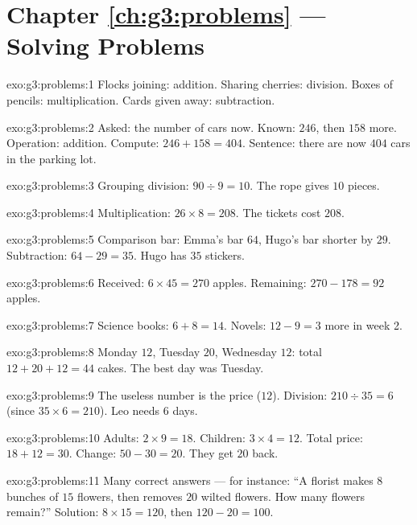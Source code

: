 \section*{Chapter \ref{ch:g3:problems} --- Solving Problems}

\begin{solution}{exo:g3:problems:1}
Flocks joining: addition. Sharing cherries: division. Boxes of
pencils: multiplication. Cards given away: subtraction.
\end{solution}

\begin{solution}{exo:g3:problems:2}
Asked: the number of cars now. Known: $246$, then $158$ more.
Operation: addition. Compute: $246 + 158 = 404$. Sentence: there are
now $404$ cars in the parking lot.
\end{solution}

\begin{solution}{exo:g3:problems:3}
Grouping division: $90 \div 9 = 10$. The rope gives $10$ pieces.
\end{solution}

\begin{solution}{exo:g3:problems:4}
Multiplication: $26 \times 8 = 208$. The tickets cost $208$.
\end{solution}

\begin{solution}{exo:g3:problems:5}
Comparison bar: Emma's bar $64$, Hugo's bar shorter by $29$.
Subtraction: $64 - 29 = 35$. Hugo has $35$ stickers.
\end{solution}

\begin{solution}{exo:g3:problems:6}
Received: $6 \times 45 = 270$ apples. Remaining:
$270 - 178 = 92$ apples.
\end{solution}

\begin{solution}{exo:g3:problems:7}
Science books: $6 + 8 = 14$. Novels: $12 - 9 = 3$ more in week 2.
\end{solution}

\begin{solution}{exo:g3:problems:8}
Monday $12$, Tuesday $20$, Wednesday $12$: total
$12 + 20 + 12 = 44$ cakes. The best day was Tuesday.
\end{solution}

\begin{solution}{exo:g3:problems:9}
The useless number is the price ($12$). Division:
$210 \div 35 = 6$ (since $35 \times 6 = 210$). Leo needs $6$ days.
\end{solution}

\begin{solution}{exo:g3:problems:10}
Adults: $2 \times 9 = 18$. Children: $3 \times 4 = 12$. Total price:
$18 + 12 = 30$. Change: $50 - 30 = 20$. They get $20$ back.
\end{solution}

\begin{solution}{exo:g3:problems:11}
Many correct answers --- for instance: ``A florist makes $8$ bunches
of $15$ flowers, then removes $20$ wilted flowers. How many flowers
remain?'' Solution: $8 \times 15 = 120$, then $120 - 20 = 100$.
\end{solution}
